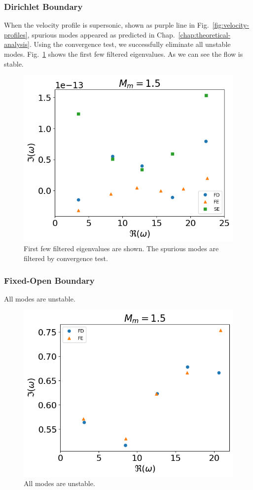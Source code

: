 \subsubsection*{Dirichlet Boundary}
When the velocity profile is supersonic, shown as purple line in Fig.~\ref{fig:velocity-profiles}, spurious modes appeared as predicted in Chap.~\ref{chap:theoretical-analysis}. Using the convergence test, we successfully eliminate all unstable modes. Fig.~\ref{fig:supersonic-v-dirichlet} shows the first few filtered eigenvalues. As we can see the flow is stable.
\begin{figure} [H]
	\centering
	\includegraphics[width=0.7\linewidth]{figures/fixed-fixed-supersonic-v}
	\caption{First few filtered eigenvalues are shown. The spurious modes are filtered by convergence test.}
	\label{fig:supersonic-v-dirichlet}
\end{figure}

\subsubsection*{Fixed-Open Boundary}
All modes are unstable.
\begin{figure} [H]
	\centering
	\includegraphics[width=0.7\linewidth]{figures/fixed-open-supersonic-v}
	\caption{All modes are unstable.}
	\label{fig:supersonic-v-fixed-open}
\end{figure}


